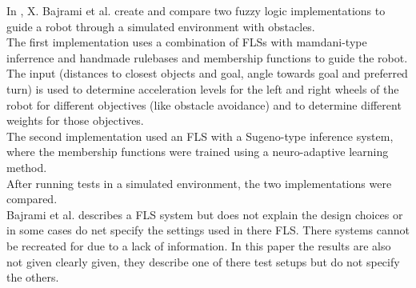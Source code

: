 \documentclass[conference]{IEEEtran}
\begin{document}
In \cite{bajrami2015artificial}, X. Bajrami et al. create and compare two fuzzy logic implementations to guide a robot through a simulated environment with obstacles.\\
The first implementation uses a combination of FLSs with mamdani-type inferrence and handmade rulebases and membership functions to guide the robot. The input (distances to closest objects and goal, angle towards goal and preferred turn) is used to determine acceleration levels for the left and right wheels of the robot for different objectives (like obstacle avoidance) and to determine different weights for those objectives.\\
The second implementation used an FLS with a Sugeno-type inference system, where the membership functions were trained using a neuro-adaptive learning method.\\
After running tests in a simulated environment, the two implementations were compared.\\
Bajrami et al. \cite{bajrami2015artificial} describes a FLS system but does not explain the design choices or in some cases do net specify the settings used in there FLS. There systems cannot be recreated for due to a lack of information. In this paper the results are also not given clearly given, they describe one of there test setups but do not specify the others.
\end{document}

